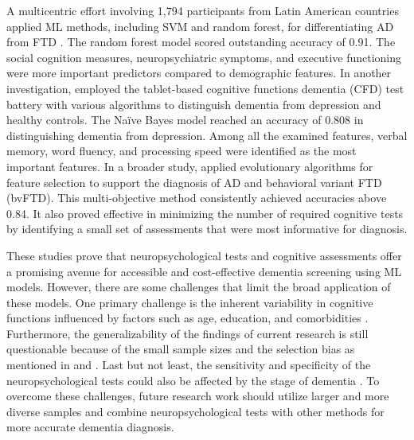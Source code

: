 A multicentric effort involving 1,794 participants from Latin American countries applied ML methods, including SVM and random forest, for differentiating AD from FTD \cite{Garcia2022Diagnosis}. The random forest model scored outstanding accuracy of 0.91. The social cognition measures, neuropsychiatric symptoms, and executive functioning were more important predictors compared to demographic features. In another investigation,  employed the tablet-based cognitive functions dementia (CFD) test battery with various algorithms to distinguish dementia from depression and healthy controls. The Naïve Bayes model reached an accuracy of 0.808 in distinguishing dementia from depression. Among all the examined features, verbal memory, word fluency, and processing speed were identified as the most important features. In a broader study,  applied evolutionary algorithms for feature selection to support the diagnosis of AD and behavioral variant FTD (\acrshort{bvFTD}). This multi-objective method consistently achieved accuracies above 0.84. It also proved effective in minimizing the number of required cognitive tests by identifying a small set of assessments that were most informative for diagnosis.

These studies prove that neuropsychological tests and cognitive assessments offer a promising avenue for accessible and cost-effective dementia screening using ML models. However, there are some challenges that limit the broad application of these models. One primary challenge is the inherent variability in cognitive functions influenced by factors such as age, education, and comorbidities \cite{Yamada2022Characteristics}. Furthermore, the generalizability of the findings of current research is still questionable because of the small sample sizes and the selection bias as mentioned in \cite{Yamada2022Characteristics} and \cite{Davoudi2021Classifying}. Last but not least, the sensitivity and specificity of the neuropsychological tests could also be affected by the stage of dementia \cite{Gurevich2017Neuropsychological}. To overcome these challenges, future research work should utilize larger and more diverse samples and combine neuropsychological tests with other methods for more accurate dementia diagnosis.

